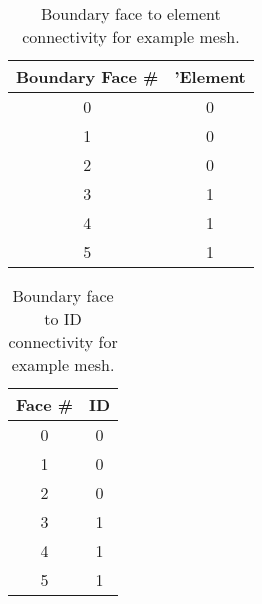 \documentclass[letterpaper]{article}
\begin{document}
\begin{table}[h!]
\centering
\begin{tabular}{|c|c|}
\hline
Boundary Face \#  & 'Element  \\
\hline
 0 & 0 \\
 1 & 0 \\
 2 & 0 \\
 3 & 1 \\
 4 & 1 \\
 5 &1 \\
\hline 
\end{tabular}
\caption{Boundary face to element connectivity for example mesh.}
\end{table}

\begin{table}[h!]
\centering
\begin{tabular}{|c|c|}
\hline
Face \#  & ID  \\
\hline
 0 & 0 \\
 1 & 0 \\
 2 & 0 \\
 3 & 1 \\
 4 & 1 \\
 5 &1 \\
\hline 
\end{tabular}
\caption{Boundary face to ID connectivity for example mesh.}
\end{table}
\end{document}
